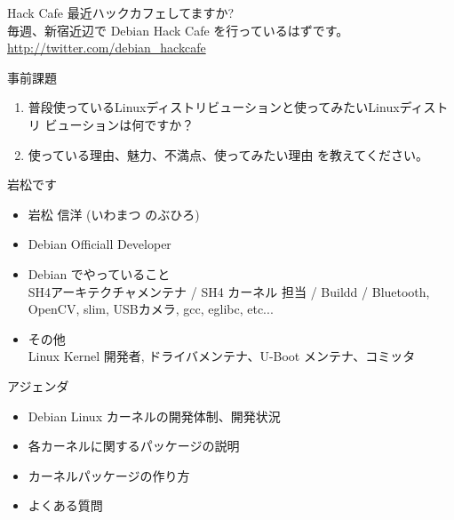 \begin{frame}{Hack Cafe}
 最近ハックカフェしてますか?\\
 毎週、新宿近辺で Debian Hack Cafe を行っているはずです。\\
 \url{http://twitter.com/debian_hackcafe}\\
\end{frame}


\begin{frame}{事前課題}
\begin{enumerate}
 \item 普段使っているLinuxディストリビューションと使ってみたいLinuxディストリ
 ビューションは何ですか？
 \item 使っている理由、魅力、不満点、使ってみたい理由
 を教えてください。
\end{enumerate}
\end{frame}

{\footnotesize

}



\begin{frame}{岩松です}
\begin{itemize}
\item 岩松 信洋 (いわまつ のぶひろ)
\item Debian Officiall Developer \\
\item Debian でやっていること \\
SH4アーキテクチャメンテナ / SH4 カーネル 担当 / Buildd / Bluetooth,
      OpenCV, slim, USBカメラ, gcc, eglibc, etc...
\item その他 \\
Linux Kernel 開発者, ドライバメンテナ、U-Boot メンテナ、コミッタ
\end{itemize}

\end{frame}



\begin{frame}{アジェンダ}
\begin{itemize}
\item Debian Linux カーネルの開発体制、開発状況
\item 各カーネルに関するパッケージの説明
\item カーネルパッケージの作り方
\item よくある質問
\end{itemize}
\end{frame}

